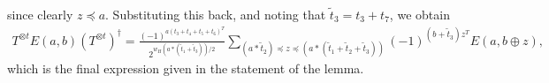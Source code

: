 \documentclass[twoside,romanappendices]{IEEEtran}
\begin{document}
since clearly $z \preceq a$.
Substituting this back, and noting that $\tilde{t}_3 = t_3 + t_7$, we obtain 
\begin{align}
T^{\otimes t} E(a,b) \left( T^{\otimes t} \right)^{\dagger} = \frac{ (-1)^{a (t_3 + t_4 + t_5 + t_6)^T} }{2^{w_H(a \ast (\tilde{t}_1 + \tilde{t}_3))/2}} \sum_{(a \ast \tilde{t}_2) \preceq z \preceq (a \ast (\tilde{t}_1 + \tilde{t}_2 + \tilde{t}_3))}  (-1)^{(b + \tilde{t}_3) z^T} E\left( a, b \oplus z \right),
\end{align}
which is the final expression given in the statement of the lemma. \hfill \IEEEQEDhere



\end{document}

